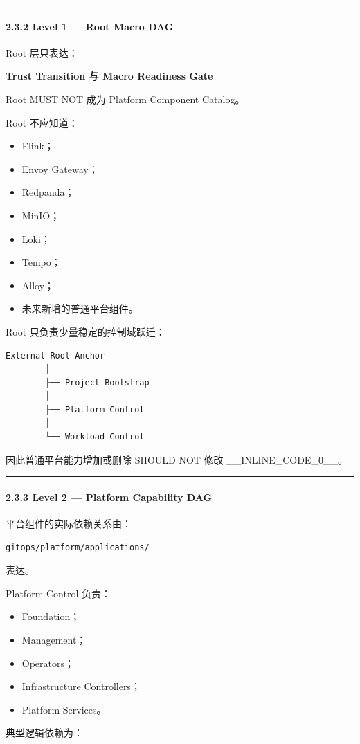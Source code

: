 \documentclass[11pt,a4paper]{article}
\begin{document}
\vspace{0.5em}\hrule\vspace{0.5em}
\paragraph{2.3.2 Level 1 — Root Macro DAG}
Root 层只表达：

\begin{gfmBlockquote}
\textbf{Trust Transition 与 Macro Readiness Gate}
\end{gfmBlockquote}
Root MUST NOT 成为 Platform Component Catalog。

Root 不应知道：

\begin{itemize}
  \item Flink；
  \item Envoy Gateway；
  \item Redpanda；
  \item MinIO；
  \item Loki；
  \item Tempo；
  \item Alloy；
  \item 未来新增的普通平台组件。
\end{itemize}
Root 只负责少量稳定的控制域跃迁：

\begin{lstlisting}[language=text]
External Root Anchor
        │
        ├── Project Bootstrap
        │
        ├── Platform Control
        │
        └── Workload Control
\end{lstlisting}
因此普通平台能力增加或删除 SHOULD NOT 修改 \_\_INLINE\_CODE\_0\_\_。

\vspace{0.5em}\hrule\vspace{0.5em}
\paragraph{2.3.3 Level 2 — Platform Capability DAG}
平台组件的实际依赖关系由：

\begin{lstlisting}[language=text]
gitops/platform/applications/
\end{lstlisting}
表达。

Platform Control 负责：

\begin{itemize}
  \item Foundation；
  \item Management；
  \item Operators；
  \item Infrastructure Controllers；
  \item Platform Services。
\end{itemize}
典型逻辑依赖为：
\end{document}
